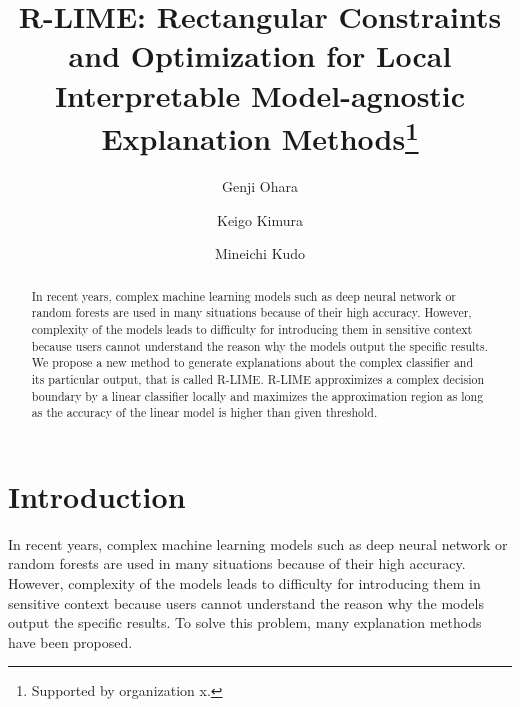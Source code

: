 \documentclass[runningheads]{llncs}
\begin{document}
%
\title{R-LIME: Rectangular Constraints and Optimization for Local Interpretable
Model-agnostic Explanation Methods\thanks{Supported by organization x.}}
%
%
\author{Genji Ohara \and
Keigo Kimura \and
Mineichi Kudo}
%
%
%
\maketitle              %
%
\begin{abstract}
    In recent years, complex machine learning models such as deep neural network or random forests are used in many situations because of their high accuracy.
    However, complexity of the models leads to difficulty for introducing them in sensitive context because users cannot understand the reason why the models output the specific results.
    We propose a new method to generate explanations about the complex classifier and its particular output, that is called R-LIME.
    R-LIME approximizes a complex decision boundary by a linear classifier locally and maximizes the approximation region as long as the accuracy of the linear model is higher than given threshold.
\end{abstract}

\section{Introduction}
In recent years, complex machine learning models such as deep neural network or random forests are used in many situations because of their high accuracy.
However, complexity of the models leads to difficulty for introducing them in sensitive context because users cannot understand the reason why the models output the specific results.
To solve this problem, many explanation methods have been proposed.
\end{document}

